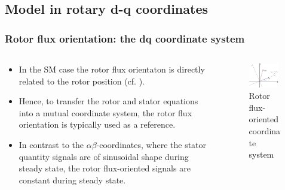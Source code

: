 \subsection{Model in rotary d-q coordinates}

\begin{frame}
	\frametitle{Rotor flux orientation: the dq coordinate system}	
    \begin{columns}
		\begin{column}{0.5\textwidth}
			\begin{itemize}
				\item In the SM case the rotor flux orientaton is directly related to the rotor position (cf. ). 
				\item Hence, to transfer the rotor and stator equations into a mutual coordinate system, the rotor flux orientation is typically used as a reference. 
				\item In contrast to the $\alpha\beta$-coordinates, where the stator quantity signals are of sinusoidal shape during steady state, the rotor flux-oriented signals are constant during steady state.
			\end{itemize}
		\end{column}
        \begin{column}{0.5\textwidth}
            \begin{figure}
                \centering
                \includegraphics[width=0.9\textwidth]{fig/lec07/dq_orientation.pdf}
                \caption{Rotor flux-oriented coordinate system}
                \label{fig:dq_orientation}
            \end{figure}
        \end{column}
    \end{columns}
\end{frame}

